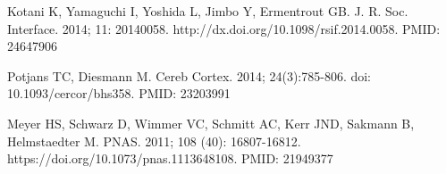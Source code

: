 \documentclass[10pt,letterpaper]{article}
\begin{document}
\begin{thebibliography}{10}
Kotani K, Yamaguchi I, Yoshida L, Jimbo Y, Ermentrout GB.
\newblock J. R. Soc. Interface. 2014; 11: 20140058. http://dx.doi.org/10.1098/rsif.2014.0058. PMID: 24647906

Potjans TC, Diesmann M.
\newblock Cereb Cortex. 2014; 24(3):785-806. doi: 10.1093/cercor/bhs358. PMID: 23203991

Meyer HS, Schwarz D, Wimmer VC, Schmitt AC, Kerr JND, Sakmann B, Helmstaedter M.
\newblock PNAS. 2011; 108 (40): 16807-16812. https://doi.org/10.1073/pnas.1113648108. PMID: 21949377


\end{thebibliography}
\end{document}
